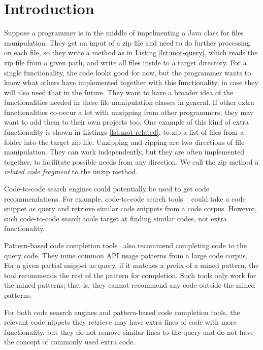 \section{Introduction}
\label{sec:intro}



Suppose a programmer is in the middle of impelmenting a Java class for files manipulation. They get an input of a zip file and need to do further processing on each file, so they write a method as in Listing \ref{lst:mot-query}, which reads the zip file from a given path, and write all files inside to a target directory. For a single functionality, the code looks good for now, but the programmer wants to know what others have implemented together with this functionality, in case they will also need that in the future. They want to have a broader idea of the functionalities needed in these file-manipulation classes in general. If other extra functionalities co-occur a lot with unzipping from other programmers, they may want to add them to their own projects too. One example of this kind of extra functionality is shown in Listings \ref{lst:mot-related}, to zip a list of files from a folder into the target zip file. Unzipping and zipping are two directions of file manipulation. They can work independently, but they are often implemented together, to facilitate possible needs from any direction. We call the zip method a \textit{related code fragment} to the unzip method.



Code-to-code search engines could potentially be used to get code recommendations. For example, code-to-code search tools ~\cite{kim2018Facoy, krugle, searchcode} could take a code snippet as query and retrieve similar code snippets from a code corpus. However, such code-to-code search tools target at finding similar codes, not extra functionality. 

Pattern-based code completion tools~\cite{nguyen2009groum, nguyen2012grapacc} also recommend completing code to the query code. They mine common API usage patterns from a large code corpus. For a given partial snippet as query, if it matches a prefix of a mined pattern, the tool recommends the rest of the pattern for completion. Such tools only work for the mined patterns; that is, they cannot recommend any code outside the mined patterns.

For both code seasrch engines and pattern-based code completion tools, the relevant code nippets they retrieve may have extra lines of code with more functionality, but they do not remove similar lines to the query and do not have the concept of commonly used extra code.

